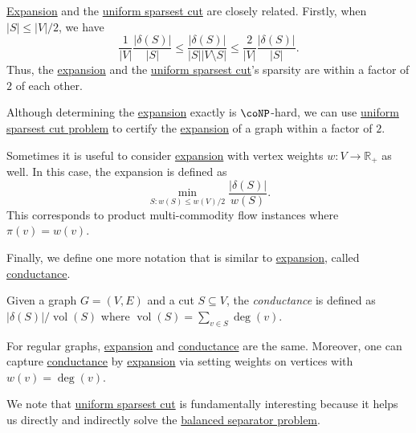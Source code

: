\hyperref[def:expansion]{Expansion} and the \hyperref[prb:sparsest-cut]{uniform sparsest cut} are closely related. Firstly, when \(\lvert S \rvert \leq \lvert V \rvert / 2\), we have
\[
	\frac{1}{\lvert V \rvert } \frac{\lvert \delta (S) \rvert }{\lvert S \rvert }
	\leq \frac{\lvert \delta (S) \rvert }{\lvert S \rvert \lvert V \setminus S \rvert }
	\leq \frac{2}{\lvert V \rvert } \frac{\lvert \delta (S) \rvert }{\lvert S \rvert }.
\]
Thus, the \hyperref[def:expansion]{expansion} and the \hyperref[prb:sparsest-cut]{uniform sparsest cut}'s sparsity are within a factor of \(2\) of each other.

\begin{remark}
	Although determining the \hyperref[def:expansion]{expansion} exactly is \(\coNP\)-hard, we can use \hyperref[prb:sparsest-cut]{uniform sparsest cut problem} to certify the \hyperref[def:expansion]{expansion} of a graph within a factor of \(2\).
\end{remark}

\begin{note}
	Sometimes it is useful to consider \hyperref[def:expansion]{expansion} with vertex weights \(w \colon V \to \mathbb{R} _+\) as well. In this case, the expansion is defined as
	\[
		\min _{S \colon w(S) \leq w(V) / 2} \frac{\lvert \delta (S) \rvert }{w(S)}.
	\]
	This corresponds to product multi-commodity flow instances where \(\pi (v) = w(v)\).
\end{note}

Finally, we define one more notation that is similar to \hyperref[def:expansion]{expansion}, called \hyperref[def:conductance]{conductance}.

\begin{definition}[Conductance]\label{def:conductance}
	Given a graph \(G = (V, E)\) and a cut \(S \subseteq V\), the \emph{conductance} is defined as \(\lvert \delta (S) \rvert / \operatorname{vol}(S) \) where \(\operatorname{vol}(S) = \sum_{v \in S} \deg(v)\).
\end{definition}

\begin{eg}
	For regular graphs, \hyperref[def:expansion]{expansion} and \hyperref[def:conductance]{conductance} are the same. Moreover, one can capture \hyperref[def:conductance]{conductance} by \hyperref[def:expansion]{expansion} via setting weights on vertices with \(w(v) = \deg (v)\).
\end{eg}

We note that \hyperref[prb:sparsest-cut]{uniform sparsest cut} is fundamentally interesting because it helps us directly and indirectly solve the \hyperref[prb:balanced-separator]{balanced separator problem}.


